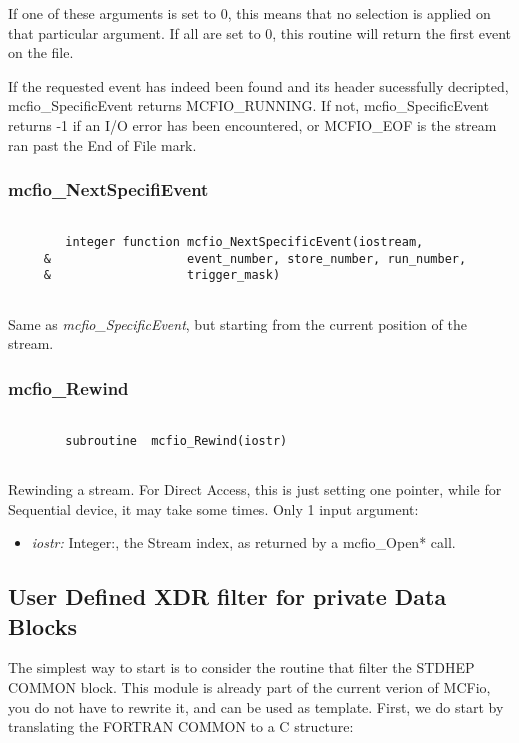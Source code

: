 If one of these arguments is set to 0, this means that no selection 
is applied on that particular  argument. If all are set to 0, this 
routine will return the first event on the file. 

	If the requested event has indeed been found and its header 
sucessfully decripted, mcfio\_SpecificEvent returns 
MCFIO\_RUNNING.  If not, mcfio\_SpecificEvent returns -1 if an I/O error has 
been encountered, or MCFIO\_EOF is the stream ran past the 
End of File mark. 

\subsubsection{mcfio\_NextSpecifiEvent}

\begin{verbatim}

        integer function mcfio_NextSpecificEvent(iostream, 
     &                   event_number, store_number, run_number, 
     &                   trigger_mask)
	
\end{verbatim}
	Same as {\em mcfio\_SpecificEvent}, but starting from the current
	position of the stream. 
	
\subsubsection{mcfio\_Rewind}

\begin{verbatim}

        subroutine  mcfio_Rewind(iostr)
    
\end{verbatim}

Rewinding a stream. For Direct Access, this is just setting 
one pointer, while for Sequential device, it may take some 
times.  Only 1 input argument: 
\begin{itemize} 
\item {\em iostr:} Integer:, the Stream index, as returned by a mcfio\_Open* 
call. 
\end{itemize}


\subsection{User Defined XDR filter for private Data Blocks}

	The simplest way to start is to consider the routine that 
filter the STDHEP COMMON block.  This module is already part of 
the current verion of MCFio, you do not have to rewrite it, and 
can be used as template. First, 
we do start by translating the FORTRAN COMMON to a C structure: 

